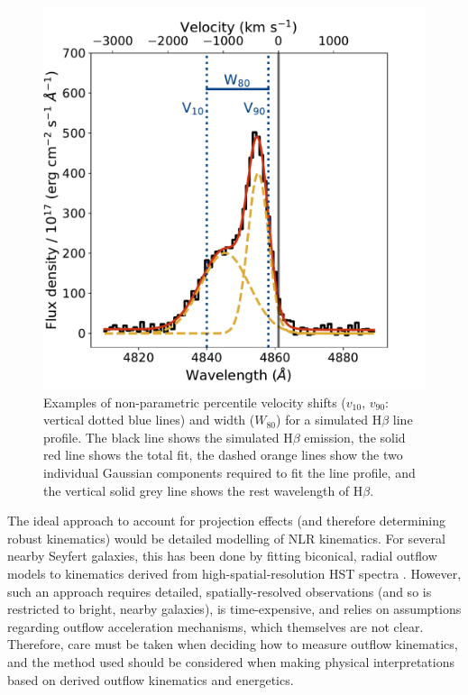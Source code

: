 \begin{figure}[!t]
    \centering
    \includegraphics[width=0.7\linewidth]{figures/introduction/hbeta_v10_v90_w80.pdf}
    \caption[Examples of non-parametric percentile velocity shifts and widths for a simulated H$\beta$ line.]{Examples of non-parametric percentile velocity shifts ($v_\mathrm{10}$, $v_\mathrm{90}$: vertical dotted blue lines) and width ($W_\mathrm{80}$) for a simulated H$\beta$ line profile. The black line shows the simulated H$\beta$ emission, the solid red line shows the total fit, the dashed orange lines show the two individual Gaussian components required to fit the line profile, and the vertical solid grey line shows the rest wavelength of H$\beta$.}
    \label{fig: introduction: outflows: kinematics: hbeta_v05_v95_w90}
\end{figure}

The ideal approach to account for projection effects (and therefore determining robust kinematics) would be detailed modelling of NLR kinematics. For several nearby Seyfert galaxies, this has been done by fitting biconical, radial outflow models to kinematics derived from high-spatial-resolution HST spectra \citep{Crenshaw2000_N1068, Crenshaw2000_N4151, Das2005, Das2006, Das2007, Revalski2021}. However, such an approach requires detailed, spatially-resolved observations (and so is restricted to bright, nearby galaxies), is time-expensive, and relies on assumptions regarding outflow acceleration mechanisms, which themselves are not clear. Therefore, care must be taken when deciding how to measure outflow kinematics, and the method used should be considered when making physical interpretations based on derived outflow kinematics and energetics.

